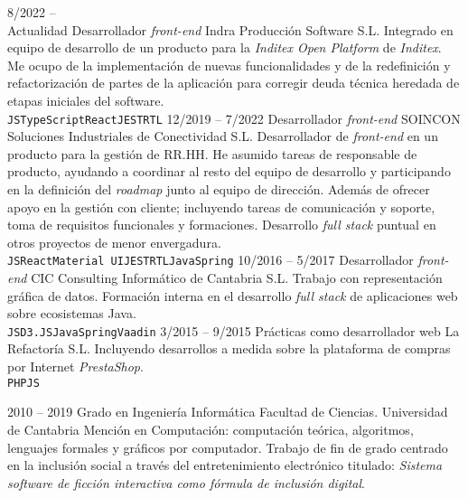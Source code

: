\documentclass[9pt]{developercv} %
\begin{document}
\begin{entrylist}
	\entry
		{8/2022 --\\ Actualidad}
		{Desarrollador \emph{front-end}}
		{Indra Producción Software S.L.}
		{Integrado en equipo de desarrollo de un producto para la \emph{Inditex Open Platform} de \emph{Inditex}. Me ocupo de la implementación de nuevas funcionalidades y de la redefinición y refactorización de partes de la aplicación para corregir deuda técnica heredada de etapas iniciales del software.\\ \texttt{JS}\slashsep\texttt{TypeScript}\slashsep\texttt{React}\slashsep\texttt{JEST}\slashsep\texttt{RTL}}
	\entry
		{12/2019 -- 7/2022}
		{Desarrollador \emph{front-end}}
		{SOINCON Soluciones Industriales de Conectividad S.L.}
		{Desarrollador de \emph{front-end} en un producto para la gestión de RR.HH. He asumido tareas de responsable de producto, ayudando a coordinar al resto del equipo de desarrollo y participando en la definición del \emph{roadmap} junto al equipo de dirección. Además de ofrecer apoyo en la gestión con cliente; incluyendo tareas de comunicación y soporte, toma de requisitos funcionales y formaciones. Desarrollo \emph{full stack} puntual en otros proyectos de menor envergadura.\\ \texttt{JS}\slashsep\texttt{React}\slashsep\texttt{Material UI}\slashsep\texttt{JEST}\slashsep\texttt{RTL}\slashsep\texttt{Java}\slashsep\texttt{Spring}}
	\entry
		{10/2016 -- 5/2017}
		{Desarrollador \emph{front-end}}
		{CIC Consulting Informático de Cantabria S.L.}
		{Trabajo con representación gráfica de datos. Formación interna en el desarrollo \emph{full stack} de aplicaciones web sobre ecosistemas Java.\\ \texttt{JS}\slashsep\texttt{D3.JS}\slashsep\texttt{Java}\slashsep\texttt{Spring}\slashsep\texttt{Vaadin}}
	\entry
		{3/2015 -- 9/2015}
		{Prácticas como desarrollador web}
		{La Refactoría S.L.}
		{Incluyendo desarrollos a medida sobre la plataforma de compras por Internet \emph{PrestaShop}.\\ \texttt{PHP}\slashsep\texttt{JS}}
\end{entrylist}

%
%


\begin{entrylist}
	\entry
		{2010 -- 2019}
		{Grado en Ingeniería Informática}
		{Facultad de Ciencias. Universidad de Cantabria}
		{Mención en Computación: computación teórica, algoritmos, lenguajes formales y gráficos por computador. Trabajo de fin de grado centrado en la inclusión social a través del entretenimiento electrónico titulado: \emph{Sistema software de ficción interactiva como fórmula de inclusión digital}.}
\end{entrylist}
\end{document}
